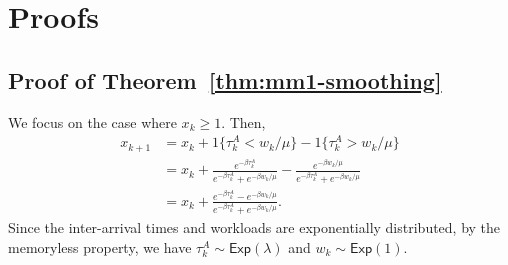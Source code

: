 \section{Proofs}
\label{sec:appendix_proofs}

\subsection{Proof of Theorem~\ref{thm:mm1-smoothing}}
\label{section:mm1-smoothing-proof}
We focus on the case where $x_k\geq1$. Then,
\begin{align*}
x_{k+1} & =x_{k}+1\{\tau_k^A<w_k/\mu\}-1\{\tau_k^A>w_k/\mu\}\\
 & =x_{k}+\frac{e^{-\beta \tau_k^A}}{e^{-\beta \tau_k^A}+e^{-\beta w_k/\mu}}-\frac{e^{-\beta w_k/\mu}}{e^{-\beta \tau_k^A}+e^{-\beta w_k/\mu}}\\
 & =x_{k}+\frac{e^{-\beta \tau_k^A}-e^{-\beta w_k/\mu}}{e^{-\beta \tau_k^A}+e^{-\beta w_k/\mu}}.
\end{align*}
Since the inter-arrival times and workloads are exponentially distributed, by the memoryless property, we have $\tau_k^A\sim\mathsf{Exp}\left(\lambda\right)$ and
$w_k\sim \mathsf{Exp}\left(1\right)$.


